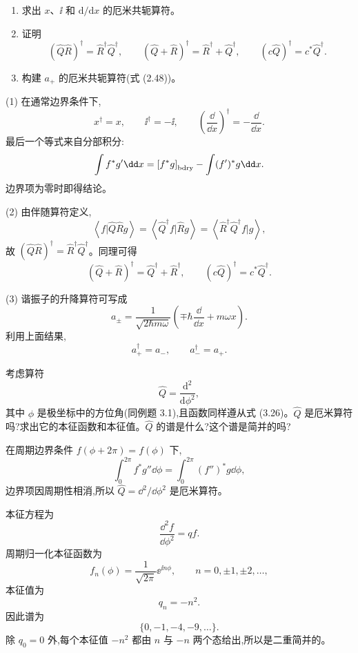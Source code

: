 \begin{question}
\begin{enumerate}
\item 求出 $x$、$\ii$ 和 $\mathrm d/\mathrm dx$ 的厄米共轭算符。
\item 证明
\[
(\hat Q\hat R)^\dagger=\hat R^\dagger\hat Q^\dagger,
\qquad
(\hat Q+\hat R)^\dagger=\hat R^\dagger+\hat Q^\dagger,
\qquad
(c\hat Q)^\dagger=c^*\hat Q^\dagger .
\]
\item 构建 $a_+$ 的厄米共轭算符(式 (2.48))。
\end{enumerate}

\par\smallskip
{}

\end{question}
\begin{solution}
(1) 在通常边界条件下,
\[
x^\dagger=x,
\qquad
\ii^\dagger=-\ii,
\qquad
\left(\frac{\dd}{\dd x}\right)^\dagger=-\frac{\dd}{\dd x}.
\]
最后一个等式来自分部积分:
\[
\int f^*g'\dd x=\left[f^*g\right]_{\rm bdry}-\int (f')^*g\dd x.
\]
边界项为零时即得结论。

(2) 由伴随算符定义,
\[
\left\langle f|\hat Q\hat Rg \right\rangle=\left\langle \hat Q^\dagger f|\hat Rg \right\rangle
=\left\langle \hat R^\dagger\hat Q^\dagger f|g \right\rangle,
\]
故 $(\hat Q\hat R)^\dagger=\hat R^\dagger\hat Q^\dagger$。同理可得
\[
(\hat Q+\hat R)^\dagger=\hat Q^\dagger+\hat R^\dagger,
\qquad
(c\hat Q)^\dagger=c^*\hat Q^\dagger.
\]

(3) 谐振子的升降算符可写成
\[
a_\pm=\frac1{\sqrt{2\hbar m\omega}}\left(\mp\hbar\frac{\dd}{\dd x}+m\omega x\right).
\]
利用上面结果,
\[
\boxed{a_+^\dagger=a_-},
\qquad
\boxed{a_-^\dagger=a_+}.
\]
\end{solution}

\begin{question}
考虑算符
\[
\hat Q=\frac{\mathrm d^2}{\mathrm d\phi^2},
\]
其中 $\phi$ 是极坐标中的方位角(同例题 3.1),且函数同样遵从式 (3.26)。$\hat Q$ 是厄米算符吗?求出它的本征函数和本征值。$\hat Q$ 的谱是什么?这个谱是简并的吗?

\par\smallskip
{}

\end{question}
\begin{solution}
在周期边界条件 $f(\phi+2\pi)=f(\phi)$ 下,
\[
\int_0^{2\pi} f^*g''\dd\phi
=\int_0^{2\pi} (f'')^*g\dd\phi,
\]
边界项因周期性相消,所以 $\hat Q=\dd^2/\dd\phi^2$ 是厄米算符。

本征方程为
\[
\frac{\dd^2 f}{\dd\phi^2}=qf.
\]
周期归一化本征函数为
\[
f_n(\phi)=\frac1{\sqrt{2\pi}}\ee^{\ii n\phi},
\qquad n=0,\pm1,\pm2,\ldots,
\]
本征值为
\[
q_n=-n^2.
\]
因此谱为
\[
\{0,-1,-4,-9,\ldots\}.
\]
除 $q_0=0$ 外,每个本征值 $-n^2$ 都由 $n$ 与 $-n$ 两个态给出,所以是二重简并的。
\end{solution}

